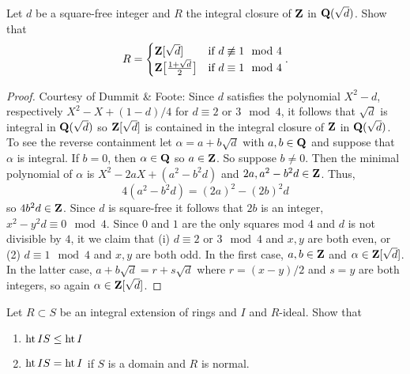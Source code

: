 \newpage
\begin{problem}
Let $d$ be a square-free integer and $R$ the integral closure of
$\mathbf{Z}$ in $\mathbf{Q}(\sqrt{d})$. Show that
\[
R=
\begin{cases}
\mathbf{Z}[\sqrt{d}]&\text{if $d\not\equiv 1\mod 4$}\\
\mathbf{Z}\bigl[\frac{1+\sqrt{d}}{2}\bigr]&\text{if $d\equiv 1\mod 4$}
\end{cases}.
\]
\end{problem}
\begin{proof}
Courtesy of Dummit \& Foote: Since $d$ satisfies the polynomial $X^2-d$,
respectively $X^2-X+(1-d)/4$ for $d\equiv 2$ or $3\mod 4$, it follows that
$\sqrt{d}$ is integral in $\mathbf{Q}(\sqrt{d})$ so $\mathbf{Z}[\sqrt{d}]$ is contained
in the integral closure of $\mathbf{Z}$ in $\mathbf{Q}(\sqrt{d})$. To see the reverse
containment let $\alpha=a+b\sqrt{d}$ with $a,b\in\mathbf{Q}$ and suppose that
$\alpha$ is integral. If $b=0$, then $\alpha\in\mathbf{Q}$ so $a\in\mathbf{Z}$. So
suppose $b\neq 0$. Then the minimal polynomial of $\alpha$ is
$X^2-2aX+(a^2-b^2d)$ and $2a,a^2-b^2d\in\mathbf{Z}$. Thus,
\[
4(a^2-b^2d)=(2a)^2-(2b)^2d
\]
so $4b^2d\in\mathbf{Z}$. Since $d$ is square-free it follows that $2b$ is an
integer, $x^2-y^2d\equiv 0\mod 4$. Since $0$ and $1$ are the only squares
mod $4$ and $d$ is not divisible by $4$, it we claim that (i) $d\equiv 2$
or $3\mod 4$ and $x,y$ are both even, or (2) $d\equiv 1\mod 4$ and $x,y$
are both odd. In the first case, $a,b\in \mathbf{Z}$ and
$\alpha\in\mathbf{Z}[\sqrt{d}]$. In the latter case, $a+b\sqrt{d}=r+s\sqrt{d}$
where $r=(x-y)/2$ and $s=y$ are both integers, so again
$\alpha\in\mathbf{Z}[\sqrt{d}]$.
\end{proof}
\newpage
\begin{problem}
Let $R\subset S$ be an integral extension of rings and $I$ and
$R$-ideal. Show that
\begin{enumerate}[label=(\alph*)]
\item $\operatorname{ht} IS\leq\operatorname{ht} I$
\item $\operatorname{ht} IS=\operatorname{ht} I$ if $S$ is a domain and $R$ is normal.
\end{enumerate}
\end{problem}
